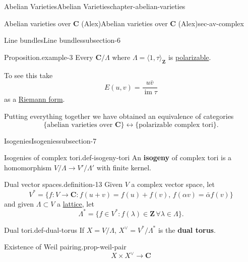 \documentclass[oneside,10pt,]{book}
\newcommand{\terminology}[1]{\textbf{#1}}
\numberwithin{equation}{section}
\newcommand{\ZZ}{\mathbf{Z}}
\newcommand{\CC}{\mathbf{C}}
\DeclareMathOperator{\im}{im}
\begin{document}
\begin{chapterptx}{Abelian Varieties}{}{Abelian Varieties}{}{}{chapter-abelian-varieties}
\begin{sectionptx}{Abelian varieties over \(\CC\) (Alex)}{}{Abelian varieties over \(\CC\) (Alex)}{}{}{sec-av-complex}
\begin{subsectionptx}{Line bundles}{}{Line bundles}{}{}{subsection-6}
\begin{example}{Proposition.}{example-3}
\hypertarget{p-73}{}%
Every \(\CC/\Lambda\) where \(\Lambda = \langle 1,\tau\rangle_{\ZZ}\) is \hyperref[def-polarizable]{polarizable}.%
\par
\hypertarget{p-74}{}%
To see this take%
\begin{equation*}
E(u,v) = \frac{u\bar v}{\im \tau}
\end{equation*}
as a \hyperref[def-riemann-form]{Riemann form}.%
\end{example}
\hypertarget{p-75}{}%
Putting everything together we have obtained an equivalence of categories%
\begin{equation*}
\{\text{abelian varieties over } \CC\} \leftrightarrow \{\text{polarizable complex tori}\}\text{.}
\end{equation*}
%
\end{subsectionptx}
%
%
\typeout{************************************************}
\typeout{************************************************}
%
\begin{subsectionptx}{Isogenies}{}{Isogenies}{}{}{subsection-7}
\begin{definition}{Isogenies of complex tori.}{def-isogeny-tori}%
\hypertarget{p-76}{}%
An \terminology{isogeny} of complex tori is a homomorphism \(V/\Lambda \to V'/\Lambda'\) with finite kernel.%
\end{definition}
\begin{definition}{Dual vector spaces.}{definition-13}%
\hypertarget{p-77}{}%
Given \(V\) a complex vector space, let%
\begin{equation*}
V^* = \{f\colon V\to \CC : f(u+v) = f(u)+f(v),\,f(\alpha v) = \bar \alpha f(v) \}
\end{equation*}
and given \(\Lambda \subset V\) a \hyperref[def-buntes-lattice]{lattice}, let%
\begin{equation*}
\Lambda^* = \{f\in V^* : f(\lambda) \in \ZZ\,\forall \lambda\in \Lambda\}\text{.}
\end{equation*}
%
\end{definition}
\begin{definition}{Dual tori.}{def-dual-torus}%
\hypertarget{p-78}{}%
If \(X = V/\Lambda\), \(X^\vee = V^*/ \Lambda^*\) is the \terminology{dual torus}.%
\end{definition}
\begin{proposition}{Existence of Weil pairing.}{}{prop-weil-pair}%
\hypertarget{p-79}{}%
%
\begin{equation*}
X\times X^\vee \to \CC
\end{equation*}

\end{proposition}
\end{subsectionptx}
\end{sectionptx}
\end{chapterptx}
\end{document}
